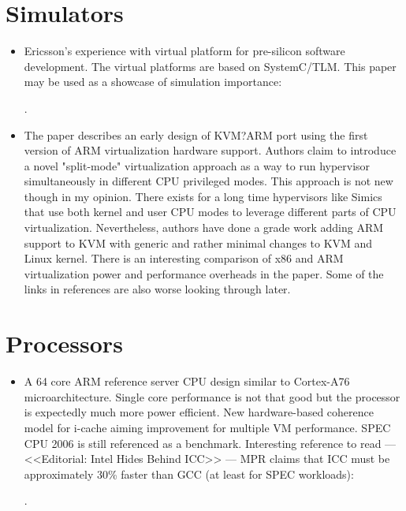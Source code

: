 



\section*{Simulators}

\begin{itemize}
    \item Ericsson's experience with virtual platform for pre-silicon software development. The virtual platforms are based on SystemC/TLM. This paper may be used as a showcase of simulation importance:

    \cite{Dahl:Ericsson-VP:2016}.

    \item The paper describes an early design of KVM?ARM port using the first version of ARM virtualization hardware support. Authors claim to introduce a novel "split-mode" virtualization approach as a way to run hypervisor simultaneously in different CPU privileged modes. This approach is not new though in my opinion. There exists for a long time hypervisors like Simics that use both kernel and user CPU modes to leverage different parts of CPU virtualization. Nevertheless, authors have done a grade work adding ARM support to KVM with generic and rather minimal changes to KVM and Linux kernel. There is an interesting comparison of x86 and ARM virtualization power and performance overheads in the paper. Some of the links in references are also worse looking through later.

    \cite{Dall:KVM-ARM:2014}
\end{itemize}

\section*{Processors}
\begin{itemize}
    \item A 64 core ARM reference server CPU design similar to Cortex-A76 microarchitecture. Single core performance is not that good but the processor is expectedly much more power efficient. New hardware-based coherence model for i-cache aiming improvement for multiple VM performance. SPEC CPU 2006 is still referenced as a benchmark. Interesting reference to read --- <<Editorial: Intel Hides Behind ICC>> --- MPR claims that ICC must be approximately 30\% faster than GCC (at least for SPEC workloads):

    \cite{Gwennap:ARM-Neoverse:2019}.
\end{itemize}

